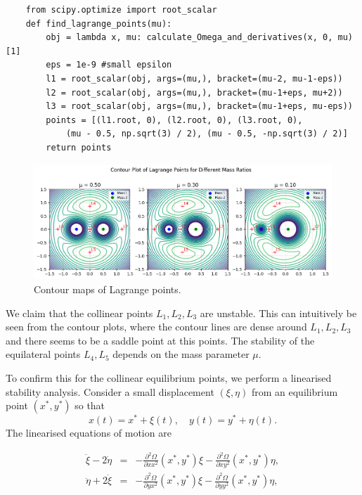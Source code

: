 \documentclass{article}
\newcommand{\sder}[2][]{\frac{\partial^2#1}{\partial#2^2}}
\begin{document}
\begin{verbatim}
    from scipy.optimize import root_scalar
    def find_lagrange_points(mu):
        obj = lambda x, mu: calculate_Omega_and_derivatives(x, 0, mu)[1]
        eps = 1e-9 #small epsilon
        l1 = root_scalar(obj, args=(mu,), bracket=(mu-2, mu-1-eps))
        l2 = root_scalar(obj, args=(mu,), bracket=(mu-1+eps, mu+2))
        l3 = root_scalar(obj, args=(mu,), bracket=(mu-1+eps, mu-eps))
        points = [(l1.root, 0), (l2.root, 0), (l3.root, 0), 
            (mu - 0.5, np.sqrt(3) / 2), (mu - 0.5, -np.sqrt(3) / 2)]
        return points
\end{verbatim}

\begin{figure}
    \centering
    \includegraphics[width=1\linewidth]{images/lagrange_contour.png}
    \caption{Contour maps of Lagrange points.}
\end{figure}

We claim that the collinear points \(L_1, L_2, L_3\) are unstable. This can intuitively be seen from the contour plots, where the contour lines are dense around \(L_1, L_2, L_3\) and there seems to be a saddle point at this points. The stability of the equilateral points \(L_4, L_5\) depends on the mass parameter \(\mu\). 

To confirm this for the collinear equilibrium points, we perform a linearised stability analysis. Consider a small displacement \((\xi, \eta)\) from an equilibrium point \((x^*, y^*)\) so that
\[ x(t) = x^* + \xi(t), \quad y(t) = y^* + \eta(t). \]
The linearised equations of motion are

\begin{eqnarray*}
    \ddot\xi - 2\dot\eta & = & -\sder[\Omega]{xx}(x^*, y^*)\xi - \sder[\Omega]{xy}(x^*, y^*)\eta, \\
    \ddot\eta + 2\dot\xi & = & -\sder[\Omega]{yx}(x^*, y^*)\xi - \sder[\Omega]{yy}(x^*, y^*)\eta, 
\end{eqnarray*}
\end{document}
